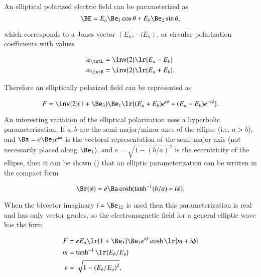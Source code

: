 
An elliptical polarized electric field can be parameterized as
\begin{dmath}\label{eqn:ellipticalWaves:340}
\BE
=
E_a \Be_1 \cos\theta + E_b \Be_2 \sin\theta,
\end{dmath}

which corresponds to a Jones vector \( (E_a, -i E_b) \), or circular polarization coefficients with values

\begin{dmath}\label{eqn:polarization:400}
\begin{aligned}
\alpha_\txtL &= \inv{2}\lr{ E_a - E_b } \\
\alpha_\txtR &= \inv{2}\lr{ E_a + E_b }.
\end{aligned}
\end{dmath}

Therefore an elliptically polarized field can be represented as

\begin{dmath}\label{eqn:polarization:420}
F = \inv{2} (1 + \Be_3) \Be_1 \lr{ (E_a + E_b) e^{i\phi} + (E_a - E_b) e^{-i\phi} }.
\end{dmath}

An interesting variation of the elliptical polarization uses a hyperbolic parameterization.
If \( a, b \) are the semi-major/minor axes of the ellipse (i.e. \( a > b \)),
and \( \Ba = a \Be_1 e^{i\psi} \) is the vectoral representation of the semi-major axis (not necessarily placed along \( \Be_1 \)),
and \( e = \sqrt{1 - (b/a)^2} \) is the eccentricity of the ellipse,
then it can be shown (\citep{hestenes1999nfc})
that an elliptic parameterization can be written
in the compact form

\begin{dmath}\label{eqn:ellipticalWaves:360}
\Br(\phi)
=
e \Ba \cosh( \tanh^{-1}(b/a) + i \phi).
\end{dmath}

When the bivector imaginary \( i = \Be_{12} \) is used then
this parameterization is real and has only vector grades, so the electromagnetic field for a general elliptic wave has the form

\begin{dmath}\label{eqn:ellipticalWaves:380}
\begin{aligned}
F &= e E_a \lr{ 1 + \Be_3 } \Be_1 e^{ i \psi } \cosh\lr{ m + i \phi} \\
m &= \tanh^{-1}\lr{ E_b/E_a } \\
e &= \sqrt{1 - {(E_b/E_a)}^2 },
\end{aligned}
\end{dmath}

